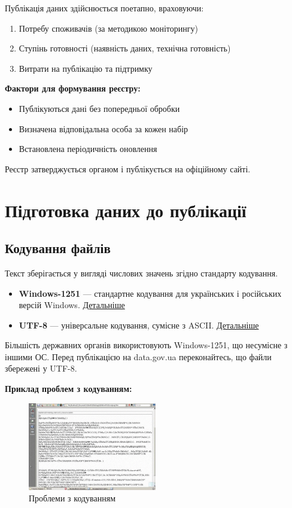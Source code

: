 Публікація даних здійснюється поетапно, враховуючи:

\begin{enumerate}
    \item Потребу споживачів (за методикою моніторингу)
    \item Ступінь готовності (наявність даних, технічна готовність)
    \item Витрати на публікацію та підтримку
\end{enumerate}

\textbf{Фактори для формування реєстру:}

\begin{itemize}
    \item Публікуються дані без попередньої обробки
    \item Визначена відповідальна особа за кожен набір
    \item Встановлена періодичність оновлення
\end{itemize}

Реєстр затверджується органом і публікується на офіційному сайті.

\section{Підготовка даних до публікації}

\subsection{Кодування файлів}

Текст зберігається у вигляді числових значень згідно стандарту кодування.

\begin{itemize}
    \item \textbf{Windows-1251} — стандартне кодування для українських і російських версій Windows.  
        \href{https://uk.wikipedia.org/wiki/Windows-1251}{Детальніше}
    \item \textbf{UTF-8} — універсальне кодування, сумісне з ASCII.  
        \href{https://uk.wikipedia.org/wiki/UTF-8}{Детальніше}
\end{itemize}

Більшість державних органів використовують Windows-1251, що несумісне з іншими ОС. Перед публікацією на data.gov.ua переконайтесь, що файли збережені у UTF-8.

\textbf{Приклад проблем з кодуванням:}

\begin{figure}[h]
    \centering
    \includegraphics[width=0.5\textwidth]{images/008.jpg}
    \caption{Проблеми з кодуванням}
\end{figure}

